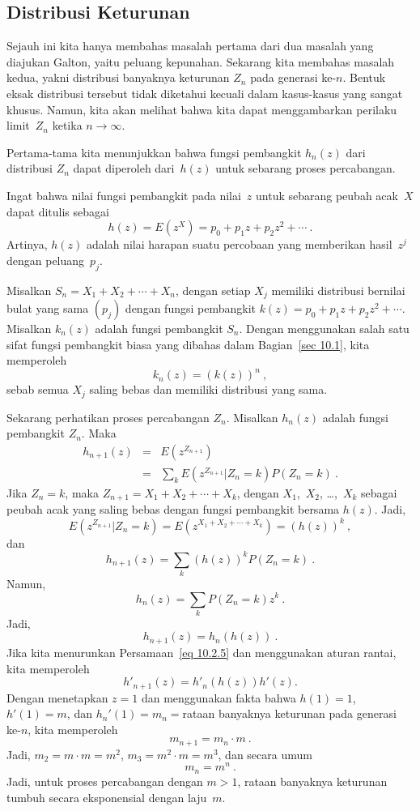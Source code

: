 \subsection*{Distribusi Keturunan}
Sejauh ini kita hanya membahas masalah pertama dari dua masalah yang diajukan Galton,
yaitu peluang kepunahan.  Sekarang kita membahas masalah kedua,
yakni distribusi banyaknya keturunan $Z_n$ pada generasi ke-$n$. 
Bentuk eksak distribusi tersebut tidak diketahui kecuali dalam kasus-kasus yang sangat khusus. 
Namun, kita akan melihat bahwa kita dapat menggambarkan perilaku limit~$Z_n$ ketika
$n \to \infty$.
\par
Pertama-tama kita menunjukkan bahwa fungsi pembangkit $h_n(z)$ dari distribusi
$Z_n$ dapat diperoleh dari~$h(z)$ untuk sebarang proses percabangan.
\par
Ingat bahwa nilai fungsi pembangkit pada nilai~$z$ untuk sebarang
peubah acak~$X$ dapat ditulis sebagai
$$
h(z) = E(z^X) = p_0 + p_1z + p_2z^2 +\cdots\ .
$$
Artinya, $h(z)$ adalah nilai harapan suatu percobaan yang memberikan hasil~$z^j$
dengan peluang~$p_j$.
\par
Misalkan $S_n = X_1 + X_2 +\cdots+ X_n$, dengan setiap
$X_j$ memiliki distribusi bernilai bulat yang sama $(p_j)$ dengan fungsi pembangkit
$k(z) = p_0 + p_1z + p_2z^2 +\cdots.$  Misalkan $k_n(z)$ adalah fungsi pembangkit
$S_n$.  Dengan menggunakan salah satu sifat fungsi pembangkit biasa yang 
dibahas dalam Bagian~\ref{sec 10.1}, kita memperoleh
$$k_n(z) = (k(z))^n\ ,$$
sebab semua $X_j$ saling bebas dan memiliki distribusi yang sama.
\par
Sekarang perhatikan proses percabangan $Z_n$.  Misalkan $h_n(z)$ adalah fungsi pembangkit
$Z_n$.  Maka
\begin{eqnarray*}
h_{n + 1}(z) &=& E(z^{Z_{n + 1}}) \\
             &=& \sum_k E(z^{Z_{n + 1}} | Z_n = k) P(Z_n = k)\ .
\end{eqnarray*}
Jika $Z_n = k$, maka $Z_{n + 1} = X_1 + X_2 +\cdots+ X_k$, dengan $X_1$,~$X_2$,
\ldots,~$X_k$ sebagai peubah acak yang saling bebas dengan fungsi pembangkit bersama
$h(z)$.  Jadi,
$$
E(z^{Z_{n + 1}} | Z_n = k) = E(z^{X_1 + X_2 +\cdots+ X_k}) = (h(z))^k\ ,
$$
dan
$$
h_{n + 1}(z) = \sum_k (h(z))^k P(Z_n = k)\ .
$$
Namun,
$$
h_n(z) = \sum_k P(Z_n = k) z^k\ .
$$
Jadi,
\begin{equation}
h_{n + 1}(z) = h_n(h(z))\ . 
\label{eq 10.2.5}
\end{equation}
Jika kita menurunkan Persamaan~\ref{eq 10.2.5} dan menggunakan aturan rantai, kita memperoleh
$$
h'_{n+1}(z) = h'_n(h(z)) h'(z) .
$$
Dengan menetapkan $z = 1$ dan menggunakan fakta bahwa $h(1) = 1$, $h'(1) = m$, dan $h_n'(1) = m_n =
{}$rataan banyaknya keturunan pada generasi ke-$n$, kita memperoleh
$$
m_{n + 1} = m_n \cdot m\ .
$$
Jadi, $m_2 = m \cdot m = m^2$, $m_3 = m^2 \cdot m = m^3$, dan secara umum
$$
m_n = m^n\ .
$$
Jadi, untuk proses percabangan dengan $m > 1$, rataan banyaknya keturunan tumbuh
secara eksponensial dengan laju~$m$.


